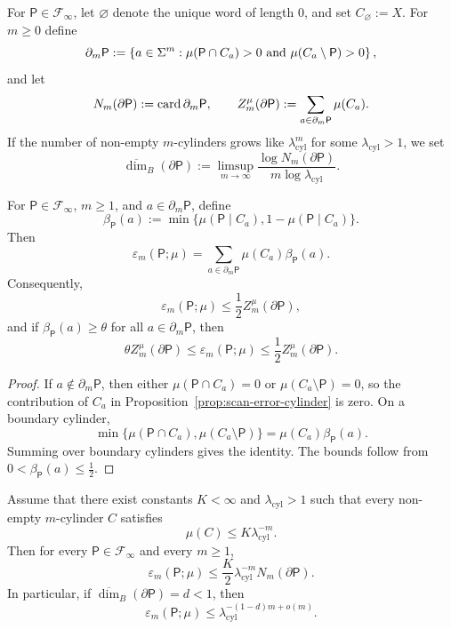 \begin{definition}
\label{def:boundary-cylinders}
For \(\mathsf{P}\in\mathcal{F}_\infty\), let \(\varnothing\) denote the
unique word of length \(0\), and set \(C_{\varnothing}:=X\).  For
\(m\geq 0\) define
\[
  \partial_m\mathsf{P}
  := \left\{a\in\Sigma^m:
      \mu(\mathsf{P}\cap C_a)>0
      \text{ and }
      \mu(C_a\setminus\mathsf{P})>0\right\},
\]
and let
\[
  N_m(\partial\mathsf{P}) := \operatorname{card}{\partial_m\mathsf{P}},
  \qquad
  Z_m^\mu(\partial\mathsf{P})
  := \sum_{a\in\partial_m\mathsf{P}}\mu(C_a).
\]
If the number of non-empty \(m\)-cylinders grows like
\(\lambda_{\mathrm{cyl}}^m\) for some \(\lambda_{\mathrm{cyl}}>1\), we
set
\[
  \overline{\dim}_B(\partial\mathsf{P})
  := \limsup_{m\to\infty}
      \frac{\log N_m(\partial\mathsf{P})}
           {m\log \lambda_{\mathrm{cyl}}}.
\]
\end{definition}

\begin{proposition}
\label{prop:weighted-boundary-decomposition}
For \(\mathsf{P}\in\mathcal{F}_\infty\), \(m\geq 1\), and
\(a\in\partial_m\mathsf{P}\), define
\[
  \beta_{\mathsf{P}}(a)
  := \min\bigl\{\mu(\mathsf{P}\mid C_a),
                1-\mu(\mathsf{P}\mid C_a)\bigr\}.
\]
Then
\[
  \varepsilon_m(\mathsf{P};\mu)
  = \sum_{a\in\partial_m\mathsf{P}}
      \mu(C_a)\beta_{\mathsf{P}}(a).
\]
Consequently,
\[
  \varepsilon_m(\mathsf{P};\mu)\leq \frac12 Z_m^\mu(\partial\mathsf{P}),
\]
and if \(\beta_{\mathsf{P}}(a)\geq \theta\) for all
\(a\in\partial_m\mathsf{P}\), then
\[
  \theta Z_m^\mu(\partial\mathsf{P})
  \leq \varepsilon_m(\mathsf{P};\mu)
  \leq \frac12 Z_m^\mu(\partial\mathsf{P}).
\]
\end{proposition}

\begin{proof}
If \(a\notin\partial_m\mathsf{P}\), then either
\(\mu(\mathsf{P}\cap C_a)=0\) or \(\mu(C_a\setminus\mathsf{P})=0\), so
the contribution of \(C_a\) in Proposition~\ref{prop:scan-error-cylinder}
is zero.  On a boundary cylinder,
\[
  \min\bigl\{\mu(\mathsf{P}\cap C_a),
             \mu(C_a\setminus\mathsf{P})\bigr\}
  = \mu(C_a)\beta_{\mathsf{P}}(a).
\]
Summing over boundary cylinders gives the identity.  The bounds follow
from \(0<\beta_{\mathsf{P}}(a)\leq \tfrac12\).
\end{proof}

\begin{theorem}
\label{thm:clarity-boundary-dimension}
Assume that there exist constants \(K<\infty\) and
\(\lambda_{\mathrm{cyl}}>1\) such that every non-empty \(m\)-cylinder
\(C\) satisfies
\[
  \mu(C)\leq K\lambda_{\mathrm{cyl}}^{-m}.
\]
Then for every \(\mathsf{P}\in\mathcal{F}_\infty\) and every \(m\geq 1\),
\[
  \varepsilon_m(\mathsf{P};\mu)
  \leq \frac{K}{2}\lambda_{\mathrm{cyl}}^{-m}
     N_m(\partial\mathsf{P}).
\]
In particular, if
\(\overline{\dim}_B(\partial\mathsf{P})=d<1\), then
\[
  \varepsilon_m(\mathsf{P};\mu)
  \leq \lambda_{\mathrm{cyl}}^{-(1-d)m+o(m)}.
\]
\end{theorem}

